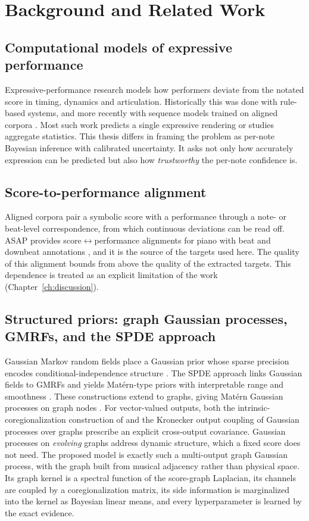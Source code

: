 \chapter{Background and Related Work}\label{ch:related}

\section{Computational models of expressive performance}
Expressive-performance research models how performers deviate from the
notated score in timing, dynamics and articulation. Historically this was
done with rule-based systems, and more recently with sequence models trained
on aligned corpora \cite{cancino2018,oore2018}. Most such work predicts a
single expressive rendering or studies aggregate statistics. This thesis
differs in framing the problem as per-note Bayesian inference with
calibrated uncertainty. It asks not only how accurately expression can be
predicted but also how \emph{trustworthy} the per-note confidence is.

\section{Score-to-performance alignment}
Aligned corpora pair a symbolic score with a performance through a note- or
beat-level correspondence, from which continuous deviations can be read off.
ASAP provides score$\leftrightarrow$performance alignments for piano with
beat and downbeat annotations \cite{asap}, and it is the source of the
targets used here. The quality of this alignment bounds from above the
quality of the extracted targets. This dependence is treated as an explicit
limitation of the work (Chapter~\ref{ch:discussion}).

\section{Structured priors: graph Gaussian processes, GMRFs, and the SPDE approach}
Gaussian Markov random fields place a Gaussian prior whose sparse precision
encodes conditional-independence structure \cite{rueheld2005}. The SPDE
approach links Gaussian fields to GMRFs and yields Mat\'ern-type priors with
interpretable range and smoothness \cite{lindgren2011}. These constructions
extend to graphs, giving Mat\'ern Gaussian processes on graph nodes
\cite{borovitskiy2021}. For vector-valued outputs, both the
intrinsic-coregionalization construction of \cite{borovitskiy2021} and the
Kronecker output coupling of Gaussian processes over graphs
\cite{venkitaraman2018} prescribe an explicit cross-output covariance.
Gaussian processes on \emph{evolving} graphs \cite{blancomulero2021} address
dynamic structure, which a fixed score does not need. The proposed model is
exactly such a multi-output graph Gaussian process, with the graph built
from musical adjacency rather than physical space. Its graph kernel is a
spectral function of the score-graph Laplacian, its channels are coupled by
a coregionalization matrix, its side information is marginalized into the
kernel as Bayesian linear means, and every hyperparameter is learned by the
exact evidence.

